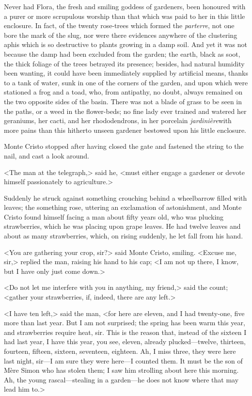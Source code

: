  Never had Flora, the fresh and smiling goddess of gardeners, been honoured with a purer or more scrupulous worship than that which was paid to her in this little enclosure. In fact, of the twenty rose-trees which formed the \textit{parterre}, not one bore the mark of the slug, nor were there evidences anywhere of the clustering aphis which is so destructive to plants growing in a damp soil. And yet it was not because the damp had been excluded from the garden; the earth, black as soot, the thick foliage of the trees betrayed its presence; besides, had natural humidity been wanting, it could have been immediately supplied by artificial means, thanks to a tank of water, sunk in one of the corners of the garden, and upon which were stationed a frog and a toad, who, from antipathy, no doubt, always remained on the two opposite sides of the basin. There was not a blade of grass to be seen in the paths, or a weed in the flower-beds; no fine lady ever trained and watered her geraniums, her cacti, and her rhododendrons, in her porcelain \textit{jardinière}with more pains than this hitherto unseen gardener bestowed upon his little enclosure. 

 Monte Cristo stopped after having closed the gate and fastened the string to the nail, and cast a look around. 

 <The man at the telegraph,> said he, <must either engage a gardener or devote himself passionately to agriculture.> 

 Suddenly he struck against something crouching behind a wheelbarrow filled with leaves; the something rose, uttering an exclamation of astonishment, and Monte Cristo found himself facing a man about fifty years old, who was plucking strawberries, which he was placing upon grape leaves. He had twelve leaves and about as many strawberries, which, on rising suddenly, he let fall from his hand. 

 <You are gathering your crop, sir?> said Monte Cristo, smiling.  <Excuse me, sir,> replied the man, raising his hand to his cap; <I am not up there, I know, but I have only just come down.> 

 <Do not let me interfere with you in anything, my friend,> said the count; <gather your strawberries, if, indeed, there are any left.> 

 <I have ten left,> said the man, <for here are eleven, and I had twenty-one, five more than last year. But I am not surprised; the spring has been warm this year, and strawberries require heat, sir. This is the reason that, instead of the sixteen I had last year, I have this year, you see, eleven, already plucked—twelve, thirteen, fourteen, fifteen, sixteen, seventeen, eighteen. Ah, I miss three, they were here last night, sir—I am sure they were here—I counted them. It must be the son of Mère Simon who has stolen them; I saw him strolling about here this morning. Ah, the young rascal—stealing in a garden—he does not know where that may lead him to.> 

